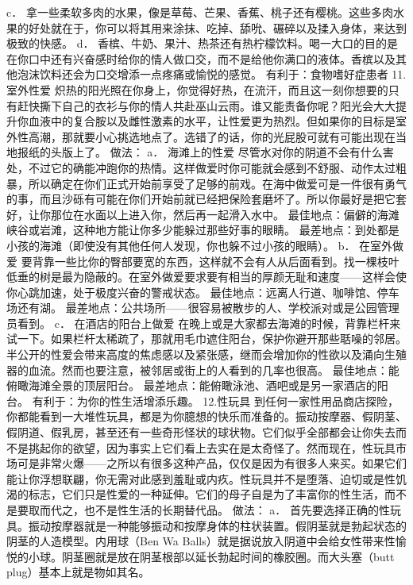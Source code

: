 \documentclass[12pt,UTF8]{ctexbook}
\begin{document}
c． 拿一些柔软多肉的水果，像是草莓、芒果、香蕉、桃子还有樱桃。这些多肉水果的好处就在于，你可以将其用来涂抹、吃掉、舔吮、碾碎以及揉入身体，来达到极致的快感。
d． 香槟、牛奶、果汁、热茶还有热柠檬饮料。喝一大口的目的是在你口中还有兴奋感时给你的情人做口交，而不是给他你满口的液体。香槟以及其他泡沫饮料还会为口交增添一点疼痛或愉悦的感觉。
有利于：食物嗜好症患者
11.室外性爱
炽热的阳光照在你身上，你觉得好热，在流汗，而且这一刻你想要的只有赶快撕下自己的衣衫与你的情人共赴巫山云雨。谁又能责备你呢？阳光会大大提升你血液中的复合胺以及雌性激素的水平，让性爱更为热烈。但如果你的目标是室外性高潮，那就要小心挑选地点了。选错了的话，你的光屁股可就有可能出现在当地报纸的头版上了。
做法：
a． 海滩上的性爱
尽管水对你的阴道不会有什么害处，不过它的确能冲跑你的热情。这样做爱时你可能就会感到不舒服、动作太过粗暴，所以确定在你们正式开始前享受了足够的前戏。在海中做爱可是一件很有勇气的事，而且沙砾有可能在你们开始前就已经把保险套磨坏了。所以你最好是把它套好，让你那位在水面以上进入你，然后再一起滑入水中。
最佳地点：偏僻的海滩峡谷或岩滩，这种地方能让你多少能躲过那些好事的眼睛。
最差地点：到处都是小孩的海滩（即使没有其他任何人发现，你也躲不过小孩的眼睛）。
b． 在室外做爱
要背靠一些比你的臀部要宽的东西，这样就不会有人从后面看到。找一棵枝叶低垂的树是最为隐蔽的。在室外做爱要求要有相当的厚颜无耻和速度——这样会使你心跳加速，处于极度兴奋的警戒状态。
最佳地点：远离人行道、咖啡馆、停车场还有湖。
最差地点：公共场所——很容易被散步的人、学校派对或是公园管理员看到。
c． 在酒店的阳台上做爱
在晚上或是大家都去海滩的时候，背靠栏杆来试一下。如果栏杆太稀疏了，那就用毛巾遮住阳台，保护你避开那些聒噪的邻居。半公开的性爱会带来高度的焦虑感以及紧张感，继而会增加你的性欲以及涌向生殖器的血流。然而也要注意，被邻居或街上的人看到的几率也很高。
最佳地点：能俯瞰海滩全景的顶层阳台。
最差地点：能俯瞰泳池、酒吧或是另一家酒店的阳台。
有利于：为你的性生活增添乐趣。
12.性玩具
到任何一家性用品商店探险，你都能看到一大堆性玩具，都是为你臆想的快乐而准备的。振动按摩器、假阴茎、假阴道、假乳房，甚至还有一些奇形怪状的球状物。它们似乎全部都会让你失去而不是挑起你的欲望，因为事实上它们看上去实在是太奇怪了。然而现在，性玩具市场可是非常火爆——之所以有很多这种产品，仅仅是因为有很多人来买。如果它们能让你浮想联翩，你无需对此感到羞耻或内疚。性玩具并不是堕落、迫切或是性饥渴的标志，它们只是性爱的一种延伸。它们的母子自是为了丰富你的性生活，而不是要取而代之，也不是性生活的长期替代品。
做法：
a． 首先要选择正确的性玩具。振动按摩器就是一种能够振动和按摩身体的柱状装置。假阴茎就是勃起状态的阴茎的人造模型。内用球（Ben Wa Balls）就是据说放入阴道中会给女性带来性愉悦的小球。阴茎圈就是放在阴茎根部以延长勃起时间的橡胶圈。而大头塞（butt plug）基本上就是物如其名。
\end{document}
